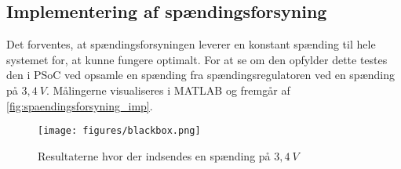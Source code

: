 \subsection{Implementering af spændingsforsyning}
Det forventes, at spændingsforsyningen leverer en konstant spænding til hele systemet for, at kunne fungere optimalt. For at se om den opfylder dette testes den i PSoC ved opsamle en spænding fra spændingsregulatoren ved en spænding på $3,4~V$. Målingerne visualiseres i MATLAB og fremgår af \autoref{fig:spaendingsforsyning_imp}.

\begin{figure}[H]
\centering
\texttt{[image: figures/blackbox.png]}
\caption{Resultaterne hvor der indsendes en spænding på $3,4~V$}
\label{fig:spaendingsforsyning_imp}
\end{figure}
